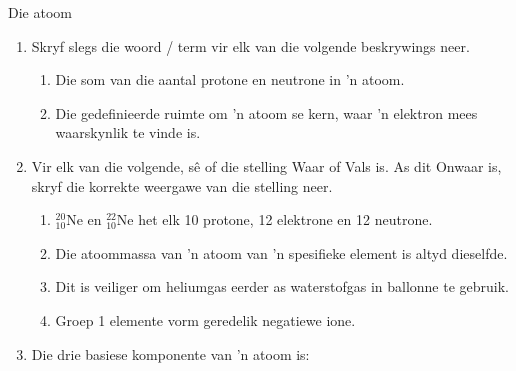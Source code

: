 \begin{eocexercises}{Die atoom}
            \nopagebreak
      \begin{enumerate}[noitemsep, label=\textbf{\arabic*}. ] 
            \item Skryf slegs die woord / term vir elk van die volgende beskrywings neer.
\begin{enumerate}[noitemsep, label=\textbf{\alph*}. ] 
            \item Die som van die aantal protone en neutrone in 'n atoom.
\item Die gedefinieerde ruimte om 'n atoom se kern, waar 'n elektron mees waarskynlik te vinde is.
\end{enumerate}
                \item Vir elk van die volgende, sê of die stelling Waar of Vals is. As dit Onwaar is, skryf die korrekte weergawe van die stelling neer.
\begin{enumerate}[noitemsep, label=\textbf{\alph*}. ] 
            \item $_{10}^{20}\text{Ne}$ en $_{10}^{22}\text{Ne}$ het elk 10 protone, 12 elektrone en 12 neutrone.
\item Die atoommassa van 'n atoom van 'n spesifieke element is altyd dieselfde.
\item Dit is veiliger om heliumgas eerder as waterstofgas in ballonne te gebruik.
\item Groep 1 elemente vorm geredelik negatiewe ione.
\end{enumerate}
                \item Die drie basiese komponente van 'n atoom is:
\begin{enumerate}[noitemsep, label=\textbf{\alph*}. ] 
          

\end{enumerate}
\end{enumerate}
\end{eocexercises}
